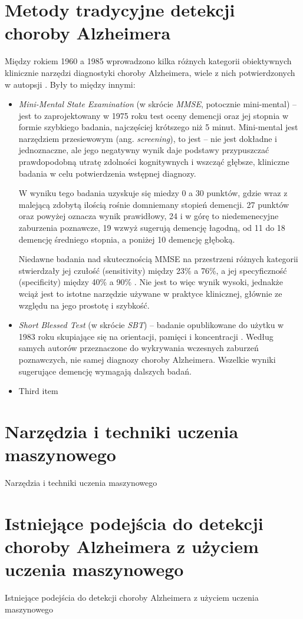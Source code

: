 \section{Metody tradycyjne detekcji choroby Alzheimera}

Między rokiem 1960 a 1985 wprowadzono kilka różnych kategorii obiektywnych klinicznie narzędzi diagnostyki choroby Alzheimera, wiele z nich potwierdzonych w autopsji \cite{khachaturian2006diagnosis}.
Były to między innymi:

\begin{itemize}

  \item \emph{Mini-Mental State Examination} (w skrócie \emph{MMSE}, potocznie mini-mental) -- jest to zaprojektowany w 1975 roku test oceny demencji oraz jej stopnia w formie szybkiego badania, najczęściej krótszego niż 5 minut.
        Mini-mental jest narzędziem przesiewowym (ang. \emph{screening}), to jest -- nie jest dokładne i jednoznaczne, ale jego negatywny wynik daje podstawy przypuszczać prawdopodobną utratę zdolności kognitywnych i wszcząć
        głębsze, kliniczne badania w celu potwierdzenia wstępnej diagnozy.

        W wyniku tego badania uzyskuje się miedzy 0 a 30 punktów, gdzie wraz z malejącą zdobytą ilością rośnie domniemany stopień demencji.
        27 punktów oraz powyżej oznacza wynik prawidłowy, 24 i w górę to niedemenecyjne zaburzenia poznawcze, 19 wzwyż sugerują demencję łagodną, od 11 do 18 demencję średniego stopnia, a poniżej 10 demencję głęboką.

        Niedawne badania nad skutecznością MMSE na przestrzeni różnych kategorii stwierdzały jej czułość (sensitivity) między 23\% a 76\%, a jej specyficzność (specificity) między 40\% a 90\% \cite{arevalo2015mini}.
        Nie jest to więc wynik wysoki, jednakże wciąż jest to istotne narzędzie używane w praktyce klinicznej, głównie ze względu na jego prostotę i szybkość.

  \item \emph{Short Blessed Test} (w skrócie \emph{SBT}) -- badanie opublikowane do użytku w 1983 roku skupiające się na orientacji, pamięci i koncentracji \cite{katzman1983validation}.
        Według samych autorów przeznaczone do wykrywania wczesnych zaburzeń poznawczych, nie samej diagnozy choroby Alzheimera.
        Wszelkie wyniki sugerujące demencję wymagają dalszych badań.

  \item Third item

\end{itemize}

\section{Narzędzia i techniki uczenia maszynowego}

Narzędzia i techniki uczenia maszynowego

\section{Istniejące podejścia do detekcji choroby Alzheimera z użyciem uczenia maszynowego}

Istniejące podejścia do detekcji choroby Alzheimera z użyciem uczenia maszynowego
